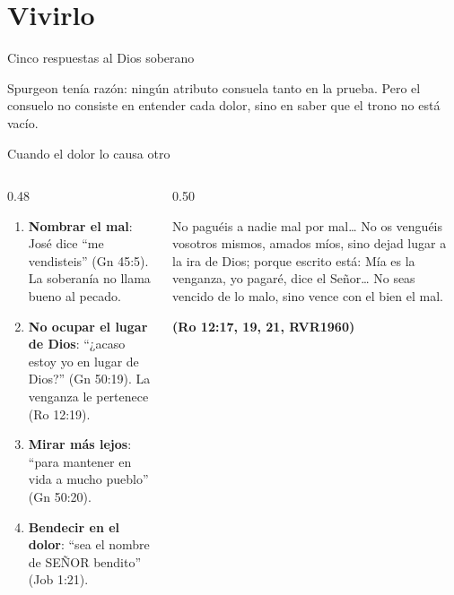 \documentclass[hyperref={bookmarks=false},aspectratio=169]{beamer}
\newcommand{\SENOR}{S{\fontsize{0.78em}{1em}\selectfont EÑOR}}
\newcommand{\fuente}[1]{\par\hfill{\upshape\bfseries\footnotesize\textcolor{azul}{#1}}}
\newcommand{\destacar}[1]{\textbf{\textcolor{azul}{#1}}}
\begin{document}
\section{Vivirlo}

\begin{frame}{Cinco respuestas al Dios soberano}
\centering
{}\par\medskip
\small\RaggedRight Spurgeon tenía razón: ningún atributo consuela tanto en la prueba. Pero el consuelo no consiste en entender cada dolor, sino en saber que el trono no está vacío.
\end{frame}

\begin{frame}{Cuando el dolor lo causa otro}
\begin{columns}[t,onlytextwidth]
\begin{column}{0.48\textwidth}\small
\begin{enumerate}
\item \destacar{Nombrar el mal}: José dice ``me vendisteis'' (Gn 45:5). La soberanía no llama bueno al pecado.
\item \destacar{No ocupar el lugar de Dios}: ``¿acaso estoy yo en lugar de Dios?'' (Gn 50:19). La venganza le pertenece (Ro 12:19).
\item \destacar{Mirar más lejos}: ``para mantener en vida a mucho pueblo'' (Gn 50:20).
\item \destacar{Bendecir en el dolor}: ``sea el nombre de \SENOR{} bendito'' (Job 1:21).
\end{enumerate}
\end{column}
\begin{column}{0.50\textwidth}
\begin{cita}No paguéis a nadie mal por mal\ldots{} No os venguéis vosotros mismos, amados míos, sino dejad lugar a la ira de Dios; porque escrito está: Mía es la venganza, yo pagaré, dice el Señor\ldots{} No seas vencido de lo malo, sino vence con el bien el mal.\fuente{(Ro 12:17, 19, 21, RVR1960)}\end{cita}
\end{column}
\end{columns}
\end{frame}
\end{document}
